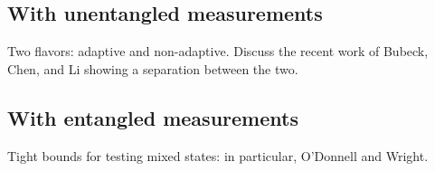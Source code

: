 \documentclass[biber]{nowfnt} %
\begin{document}
\subsection{With unentangled measurements}
Two flavors: adaptive and non-adaptive. Discuss the recent work of
Bubeck, Chen, and Li showing a separation between the two.
\subsection{With entangled measurements}
Tight bounds for testing mixed states: in particular, O’Donnell and
Wright.

\appendix

\backmatter  %

\printbibliography
\end{document}
